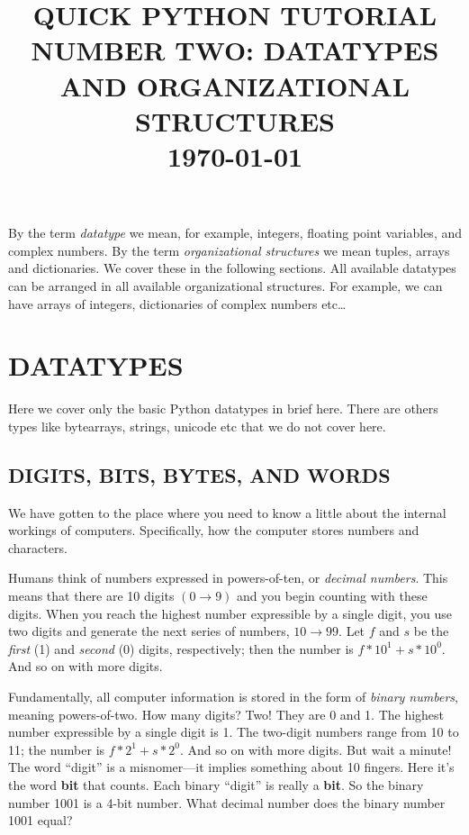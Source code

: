 \documentclass[psfig,preprint]{aastex}
\begin{document}
\title{\bf QUICK PYTHON TUTORIAL NUMBER TWO: DATATYPES AND ORGANIZATIONAL STRUCTURES\\ \today}

\tableofcontents
	

By the term {\it datatype} we mean, for example, integers,
floating point variables, and complex numbers.  By the term {\it
organizational structures} we mean tuples, arrays and
dictionaries.  We cover these in the following sections.  All
available datatypes can be arranged in all available organizational
structures.  For example, we can have arrays of integers, dictionaries of
complex numbers etc\dots

\section {DATATYPES}
	Here we cover only the basic Python datatypes in brief here. 
There are others types like bytearrays, strings, unicode etc that we do 
not cover here.

\subsection{DIGITS, BITS, BYTES, AND WORDS}

	We have gotten to the place where you need to know a little
about the internal workings of computers. Specifically, how the computer
stores numbers and characters.

	Humans think of numbers expressed in powers-of-ten, or {\it
decimal numbers}.  This means that there are 10 digits $(0 \rightarrow
9)$ and you begin counting with these digits.  When you reach the
highest number expressible by a single digit, you use two digits and
generate the next series of numbers, $10 \rightarrow 99$.  Let $f$ and
$s$ be the {\it first} (1) and {\it second} (0) digits, respectively; then the
number is $f*10^1 + s*10^0$.  And so on with more digits. 

	Fundamentally, all computer information is stored in the form of
{\it binary numbers}, meaning powers-of-two.  How many digits? Two! They
are 0 and 1.  The highest number expressible by a single digit is 1. 
The two-digit numbers range from 10 to 11; the number is $f*2^1 + s*2^0$.  And
so on with more digits.  But wait a minute! The word ``digit'' is a
misnomer---it implies something about 10 fingers.  Here it's the word
{\bf bit} that counts.  Each binary ``digit'' is really a {\bf bit}.  So
the binary number 1001 is a 4-bit number.  What decimal number does the
binary number 1001 equal?
\end{document}
